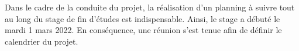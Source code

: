 \begin{center}

\end{center}
Dans le cadre de la conduite du projet, la réalisation d'un planning à suivre tout au long du stage de fin d'études est indispensable. Ainsi, le stage a débuté le mardi 1 mars 2022. En conséquence, une réunion s'est tenue afin de définir le calendrier du projet.
